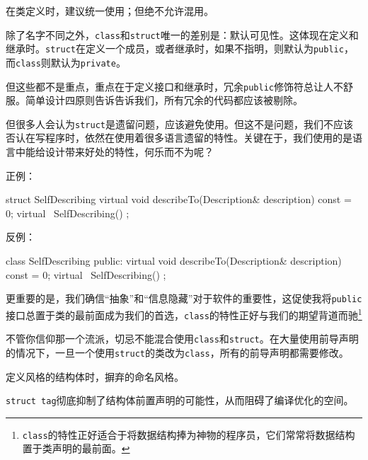 \begin{content}

\begin{advise}
在类定义时，建议统一使用；但绝不允许混用。
\end{advise}

除了名字不同之外，\texttt{class}和\texttt{struct}唯一的差别是：默认可见性。这体现在定义和继承时。\texttt{struct}在定义一个成员，或者继承时，如果不指明，则默认为\texttt{public}，而\texttt{class}则默认为\texttt{private}。

但这些都不是重点，重点在于定义接口和继承时，冗余\texttt{public}修饰符总让人不舒服。简单设计四原则告诉告诉我们，所有冗余的代码都应该被剔除。

但很多人会认为\texttt{struct}是\clang{}遗留问题，应该避免使用。但这不是问题，我们不应该否认在写\cpp{}程序时，依然在使用着很多\clang{}语言遗留的特性。关键在于，我们使用的是\clang{}语言中能给设计带来好处的特性，何乐而不为呢？

正例：
\begin{leftbar}
\begin{c++}
struct SelfDescribing
{
    virtual void describeTo(Description& description) const = 0;
    virtual ~SelfDescribing() {}
};
\end{c++}
\end{leftbar}

反例：
\begin{leftbar}
\begin{c++}
class SelfDescribing
{
public:
    virtual void describeTo(Description& description) const = 0;
    virtual ~SelfDescribing() {}
};
\end{c++}
\end{leftbar}

更重要的是，我们确信“抽象”和“信息隐藏”对于软件的重要性，这促使我将\texttt{public}接口总置于类的最前面成为我们的首选，\texttt{class}的特性正好与我们的期望背道而驰\footnote{\texttt{class}的特性正好适合于将数据结构捧为神物的程序员，它们常常将数据结构置于类声明的最前面。}

不管你信仰那一个流派，切忌不能混合使用\texttt{class}和\texttt{struct}。在大量使用前导声明的情况下，一旦一个使用\texttt{struct}的类改为\texttt{class}，所有的前导声明都需要修改。

\begin{regulation}
定义\clang{}风格的结构体时，摒弃的命名风格。
\end{regulation}

\texttt{struct tag}彻底抑制了结构体前置声明的可能性，从而阻碍了编译优化的空间。


\end{content}
